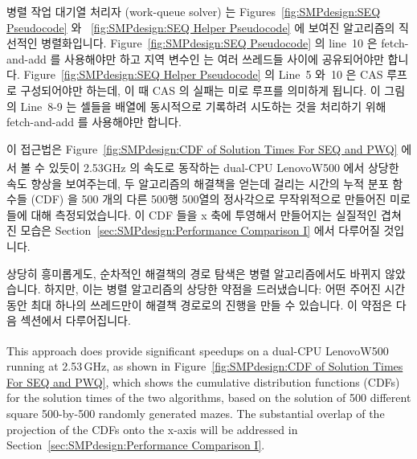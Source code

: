 병렬 작업 대기열 처리자 (work-queue solver) 는
Figures~\ref{fig:SMPdesign:SEQ Pseudocode} 와
~\ref{fig:SMPdesign:SEQ Helper Pseudocode} 에 보여진 알고리즘의 직선적인
병렬화입니다.
Figure~\ref{fig:SMPdesign:SEQ Pseudocode} 의 line~10 은 fetch-and-add 를
사용해야만 하고 지역 변수인  는 여러 쓰레드들 사이에 공유되어야만
합니다.
Figure~\ref{fig:SMPdesign:SEQ Helper Pseudocode} 의 Line~5 와~10 은 CAS 루프로
구성되어야만 하는데, 이 때 CAS 의 실패는 미로 루프를 의미하게 됩니다.
이 그림의 Line~8-9 는 셀들을  배열에 동시적으로 기록하려
시도하는 것을 처리하기 위해 fetch-and-add 를 사용해야만 합니다.

이 접근법은 Figure~\ref{fig:SMPdesign:CDF of Solution Times For SEQ and PWQ}
에서 볼 수 있듯이 2.53GHz 의 속도로 동작하는 dual-CPU
Lenovo\textsuperscript\texttrademark W500 에서 상당한 속도 향상을 보여주는데,
두 알고리즘의 해결책을 얻는데 걸리는 시간의 누적 분포 함수들 (CDF) 을 500 개의
다른 500행 500열의 정사각으로 무작위적으로 만들어진 미로들에 대해
측정되었습니다.
이 CDF 들을 x 축에 투영해서 만들어지는 실질적인 겹쳐진 모습은
Section~\ref{sec:SMPdesign:Performance Comparison I} 에서 다루어질 것입니다.

상당히 흥미롭게도, 순차적인 해결책의 경로 탐색은 병렬 알고리즘에서도 바뀌지
않았습니다.
하지만, 이는 병렬 알고리즘의 상당한 약점을 드러냈습니다:
어떤 주어진 시간 동안 최대 하나의 쓰레드만이 해결책 경로로의 진행을 만들 수
있습니다.
이 약점은 다음 섹션에서 다루어집니다.
\iffalse


This approach does provide significant speedups on a dual-CPU
Lenovo\textsuperscript\texttrademark W500
running at 2.53\,GHz, as shown in
Figure~\ref{fig:SMPdesign:CDF of Solution Times For SEQ and PWQ},
which shows the cumulative distribution functions (CDFs) for the solution
times of the two algorithms, based on the solution of 500 different square
500-by-500 randomly generated mazes.
The substantial overlap
of the projection of the CDFs onto the x-axis will be addressed in
Section~\ref{sec:SMPdesign:Performance Comparison I}.

